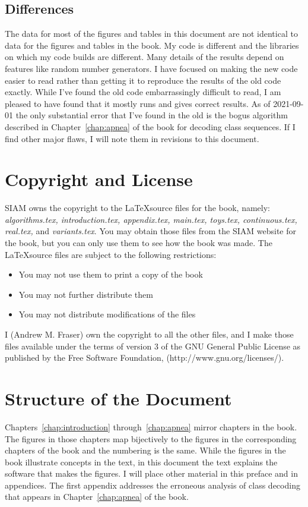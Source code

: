 \documentclass[prelim,showlabels]{book}
\begin{document}
\subsection*{Differences}
The data for most of the figures and tables in this document are not
identical to data for the figures and tables in the book.  My code is
different and the libraries on which my code builds are different.
Many details of the results depend on features like random number
generators.  I have focused on making the new code easier to read
rather than getting it to reproduce the results of the old code
exactly.  While I've found the old code embarrassingly difficult to
read, I am pleased to have found that it mostly runs and gives correct
results.  As of 2021-09-01 the only substantial error that I've found
in the old is the bogus algorithm described in
Chapter~\ref{chap:apnea} of the book for decoding class sequences.  If
I find other major flaws, I will note them in revisions to this
document.

\section*{Copyright and License}

SIAM owns the copyright to the \LaTeX source files for the book,
namely: \emph{algorithms.tex, introduction.tex, appendix.tex,
  main.tex, toys.tex, continuous.tex, real.tex,} and
\emph{variants.tex}.  You may obtain those files from the SIAM website
for the book, but you can only use them to see how the book
was made.  The \LaTeX source files are subject to the following
restrictions:
\begin{itemize}
\item You may not use them to print a copy of the book
\item You may not further distribute them
\item You may not distribute modifications of the files
\end{itemize}

I (Andrew M. Fraser) own the copyright to all the other files, and I
make those files available under the terms of version 3 of the GNU
General Public License as published by the Free Software Foundation,
(http://www.gnu.org/licenses/).

\section*{Structure of the Document}
Chapters~\ref{chap:introduction} through~\ref{chap:apnea} mirror
chapters in the book.  The figures in those chapters map bijectively
to the figures in the corresponding chapters of the book and the
numbering is the same.  While the figures in the book illustrate
concepts in the text, in this document the text explains the software
that makes the figures.  I will place other material in this preface
and in appendices.  The first appendix addresses the erroneous analysis
of class decoding that appears in Chapter~\ref{chap:apnea} of the
book.
\end{document}
